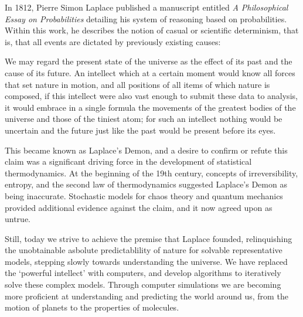 In 1812, Pierre Simon Laplace published a manuscript entitled
\textit{A Philosophical Essay on Probabilities} detailing his system
of reasoning based on probabilities.\cite{Laplace1902} Within this
work, he describes the notion of casual or scientific determinism,
that is, that all events are dictated by previously existing causes:
 
\begin{displayquote}
We may regard the present state of the universe as the effect of
its past and the cause of its future. An intellect which at a certain
moment would know all forces that set nature in motion, and all
positions of all items of which nature is composed, if this intellect
were also vast enough to submit these data to analysis, it would
embrace in a single formula the movements of the greatest bodies of
the universe and those of the tiniest atom; for such an intellect
nothing would be uncertain and the future just like the past would be
present before its eyes.
\end{displayquote}

This became known as Laplace's Demon, and a desire to confirm or
refute this claim was a significant driving force in the development
of statistical thermodynamics.  At the beginning of the 19th century,
concepts of irreversibility, entropy, and the second law of
thermodynamics suggested Laplace's Demon as being inaccurate.
Stochastic models for chaos theory and quantum mechanics provided
additional evidence against the claim, and it now agreed upon as
untrue.

Still, today we strive to achieve the premise that Laplace founded,
relinquishing the unobtainable asbolute predictablility of nature for
solvable representative models, stepping slowly towards understanding
the universe. We have replaced the `powerful intellect' with
computers, and develop algorithms to iteratively solve these
complex models. Through computer simulations we are becoming more
proficient at understanding and predicting the world around us, from
the motion of planets to the properties of molecules.

